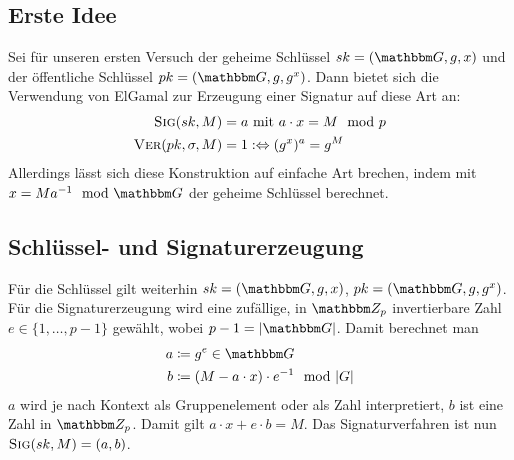 \subsection{Erste Idee} 
Sei für unseren ersten Versuch der geheime
Schlüssel $\skey = (\G, g, x)$ und der öffentliche Schlüssel $\pkey =
(\G, g, g^x)$. Dann bietet sich die Verwendung von ElGamal zur Erzeugung
einer Signatur auf diese Art an:
\begin{align*} 
  \textsc{Sig}(sk,M) &= a \text{ mit } a \cdot x = M \mod p \\  
  \textsc{Ver}(pk,\sigma,M) &= 1 :\Leftrightarrow (g^x)^a =  g^M
\end{align*} 
Allerdings lässt sich diese Konstruktion auf einfache Art
brechen, indem mit $x = M a^{-1} \mod \G$ der geheime Schlüssel
berechnet.
\subsection{Schlüssel- und Signaturerzeugung} 
Für die Schlüssel gilt weiterhin $\skey = (\G, g, x)$, $\pkey = (\G, g,
g^x)$.  Für die Signaturerzeugung wird eine zufällige, in $\Z{p}$
invertierbare Zahl $e \in \{1, \dots, p - 1\}$ gewählt, wobei
$p-1=|\G|$. Damit berechnet man
\begin{align*} 
  a &\coloneqq g^e \in \G\\ 
  b &\coloneqq (M - a \cdot x) \cdot e^{-1} \mod |G|
\end{align*} 
$a$ wird je nach Kontext als Gruppenelement oder als Zahl interpretiert,
$b$ ist eine Zahl in $\Z{p}$.  Damit gilt $a \cdot x + e \cdot b =
M$. Das Signaturverfahren ist nun $\textsc{Sig}(sk,M) = (a, b)$.

